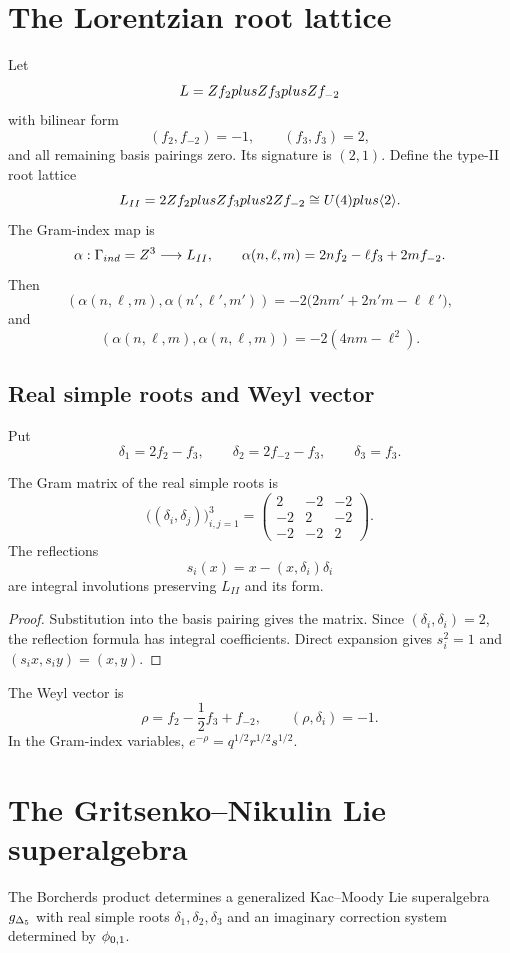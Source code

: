 \chapter{The Lorentzian root lattice}
Let
\[
 L=Z f_2plusZ f_3plusZ f_{-2}
\]
with bilinear form
\[
 (f_2,f_{-2})=-1,
 \qquad (f_3,f_3)=2,
\]
and all remaining basis pairings zero. Its signature is $(2,1)$. Define the type-II root lattice
\[
 L_{II}=2Z f_2plusZ f_3plus2Z f_{-2}
 \cong U(4)plus\langle 2\rangle.
\]
The Gram-index map is
\[
 \alpha:\Gamma_{ind}=Z^3\longrightarrow L_{II},
 \qquad
 \alpha(n,\ell,m)=2nf_2-\ell f_3+2mf_{-2}.
\]
Then
\[
 (\alpha(n,\ell,m),\alpha(n',\ell',m'))
 =-2\bigl(2nm'+2n'm-\ell\ell'\bigr),
\]
and
\[
 (\alpha(n,\ell,m),\alpha(n,\ell,m))
 =-2(4nm-\ell^2).
\]

\section{Real simple roots and Weyl vector}
Put
\[
 \delta_1=2f_2-f_3,
 \qquad
 \delta_2=2f_{-2}-f_3,
 \qquad
 \delta_3=f_3.
\]

\begin{proposition}
The Gram matrix of the real simple roots is
\[
 \bigl((\delta_i,\delta_j)\bigr)_{i,j=1}^3
 =\begin{pmatrix}
 2&-2&-2\\
 -2&2&-2\\
 -2&-2&2
 \end{pmatrix}.
\]
The reflections
\[
 s_i(x)=x-(x,\delta_i)\delta_i
\]
are integral involutions preserving $L_{II}$ and its form.
\end{proposition}
\begin{proof}
Substitution into the basis pairing gives the matrix. Since $(\delta_i,\delta_i)=2$, the reflection formula has integral coefficients. Direct expansion gives $s_i^2=1$ and $(s_ix,s_iy)=(x,y)$.
\end{proof}

The Weyl vector is
\[
 \rho=f_2-\frac12f_3+f_{-2},
 \qquad (\rho,\delta_i)=-1.
\]
In the Gram-index variables, $e^{-\rho}=q^{1/2}r^{1/2}s^{1/2}$.

\chapter[The denominator algebra]{The Gritsenko--Nikulin Lie superalgebra}
The Borcherds product determines a generalized Kac--Moody Lie superalgebra ${g_{\Delta_5}}$ with real simple roots $\delta_1,\delta_2,\delta_3$ and an imaginary correction system determined by ${\phi_{0,1}}$.

